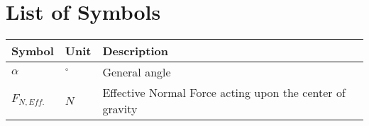 \chapter*{List of Symbols}

\begin{center}

	\begin{tabular}{lll} \hline
		Symbol & Unit & Description\\ \hline
		$\alpha$ & $^{\circ}$ & General angle \\
		$F_{N, Eff.}$ & $N$ & Effective Normal Force acting upon the center of gravity \\
	\end{tabular}

\end{center}